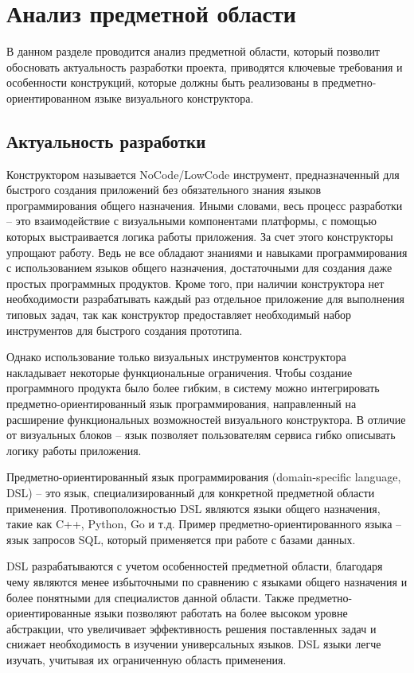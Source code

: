 
\section{Анализ предметной области}

В данном разделе проводится анализ предметной области,
который позволит обосновать актуальность разработки проекта,
приводятся ключевые требования и особенности конструкций,
которые должны быть реализованы в предметно-ориентированном языке визуального конструктора.

\subsection{Актуальность разработки}

Конструктором называется NoCode/LowCode инструмент,
предназначенный для быстрого создания приложений без обязательного знания языков программирования общего назначения.
Иными словами, весь процесс разработки -- это взаимодействие с визуальными компонентами платформы,
с помощью которых выстраивается логика работы приложения. За счет этого конструкторы упрощают работу.
Ведь не все обладают знаниями и навыками программирования с использованием языков общего назначения,
достаточными для создания даже простых программных продуктов.
Кроме того, при наличии конструктора нет необходимости разрабатывать каждый раз отдельное приложение для выполнения типовых задач,
так как конструктор предоставляет необходимый набор инструментов для быстрого создания прототипа.

Однако использование только визуальных инструментов конструктора накладывает некоторые функциональные ограничения.
Чтобы создание программного продукта было более гибким, в систему можно интегрировать предметно-ориентированный язык программирования,
направленный на расширение функциональных возможностей визуального конструктора.
В отличие от визуальных блоков – язык позволяет пользователям сервиса гибко описывать логику работы приложения.

Предметно-ориентированный язык программирования (domain-specific language, DSL) -- это язык, специализированный для конкретной предметной области применения.
Противоположностью DSL являются языки общего назначения, такие как C++, Python, Go и т.д.
Пример предметно-ориентированного языка – язык запросов SQL, который применяется при работе с базами данных.

DSL разрабатываются с учетом особенностей предметной области,
благодаря чему являются менее избыточными по сравнению с языками общего назначения и более понятными для специалистов данной области.
Также предметно-ориентированные языки позволяют работать на более высоком уровне абстракции,
что увеличивает эффективность решения поставленных задач и снижает необходимость в изучении универсальных языков.
DSL языки легче изучать, учитывая их ограниченную область применения.

